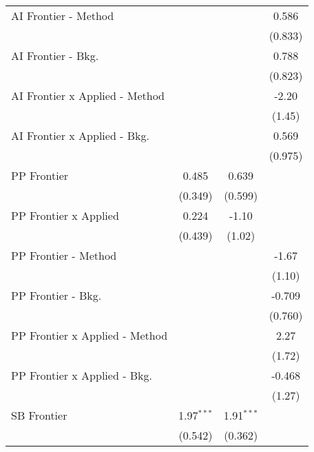 \begin{tabular}{lccc}
   AI Frontier - Method           &               &               & 0.586\\   
                                  &               &               & (0.833)\\   
   AI Frontier - Bkg.             &               &               & 0.788\\   
                                  &               &               & (0.823)\\   
   AI Frontier x Applied - Method &               &               & -2.20\\   
                                  &               &               & (1.45)\\   
   AI Frontier x Applied - Bkg.   &               &               & 0.569\\   
                                  &               &               & (0.975)\\   
   PP Frontier                    & 0.485         & 0.639         &   \\   
                                  & (0.349)       & (0.599)       &   \\   
   PP Frontier x Applied          & 0.224         & -1.10         &   \\   
                                  & (0.439)       & (1.02)        &   \\   
   PP Frontier - Method           &               &               & -1.67\\   
                                  &               &               & (1.10)\\   
   PP Frontier - Bkg.             &               &               & -0.709\\   
                                  &               &               & (0.760)\\   
   PP Frontier x Applied - Method &               &               & 2.27\\   
                                  &               &               & (1.72)\\   
   PP Frontier x Applied - Bkg.   &               &               & -0.468\\   
                                  &               &               & (1.27)\\   
   SB Frontier                    & 1.97$^{***}$  & 1.91$^{***}$  &   \\   
                                  & (0.542)       & (0.362)       &   \\   

\end{tabular}
